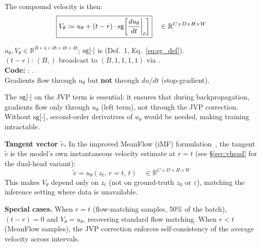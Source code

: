 \noindent
The compound velocity is then:
\begin{equation}
  \boxed{
  V_\theta
    \coloneqq u_\theta
      + (t - r) \cdot \operatorname{sg}\!\left[\frac{du_\theta}{dt}\bigg|_{\tilde{v}}\right]
  }
  \quad \in \mathbb{R}^{C \times D \times H \times W}
  \label{eq:compound_V}
\end{equation}
\begin{shapes}
$u_\theta, V_\theta \in \mathbb{R}^{B \times 4 \times 48 \times 48 \times 48}$;
$\operatorname{sg}[\cdot]$ is  (Def.~1, Eq.~\ref{eq:sg_def}).\\
$(t-r)$: $(B,)$ broadcast to $(B,1,1,1,1)$ via .\\
\textbf{Code:} :
.\\
Gradients flow through $u_\theta$ but \textbf{not} through $du/dt$ (stop-gradient).
\end{shapes}

\noindent
The $\operatorname{sg}[\cdot]$ on the JVP term is essential: it ensures that during
backpropagation, gradients flow only through $u_\theta$ (left term), not
through the JVP correction.  Without $\operatorname{sg}[\cdot]$, second-order derivatives of
$u_\theta$ would be needed, making training intractable.

\textbf{Tangent vector $\tilde{v}$.}  In the improved MeanFlow (iMF)
formulation~\cite{imf}, the tangent $\tilde{v}$ is the model's own
instantaneous velocity estimate at $r{=}t$ (see \S\ref{sec:vhead} for
the dual-head variant):
\begin{equation}
  \tilde{v} = u_\theta(z_t,\,r{=}t,\,t)
  \quad \in \mathbb{R}^{C \times D \times H \times W}
  \label{eq:tangent_imf}
\end{equation}
This makes $V_\theta$ depend only on $z_t$ (not on ground-truth $z_0$ or
$\varepsilon$), matching the inference setting where data is unavailable.

\textbf{Special cases.}  When $r = t$ (flow-matching samples, 50\% of the
batch), $(t-r) = 0$ and $V_\theta = u_\theta$, recovering standard flow
matching.  When $r < t$ (MeanFlow samples), the JVP correction enforces
self-consistency of the average velocity across intervals.